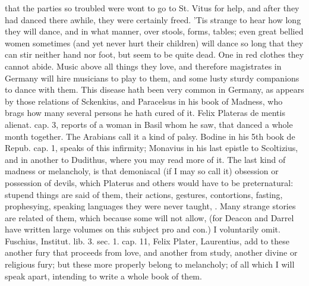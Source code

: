 {that the parties so troubled were wont to go to St. Vitus for help, and
after they had danced there awhile, they were certainly freed.
'Tis strange to hear how long they will dance, and in what manner, over
stools, forms, tables; even great bellied women sometimes (and yet
never hurt their children) will dance so long that they can stir
neither hand nor foot, but seem to be quite dead. One in red clothes
they cannot abide. Music above all things they love, and therefore
magistrates in Germany will hire musicians to play to them, and some
lusty sturdy companions to dance with them. This disease hath been very
common in Germany, as appears by those relations of Sckenkius, and
Paracelsus in his book of Madness, who brags how many several persons
he hath cured of it. Felix Plateras de mentis alienat. cap. 3, reports
of a woman in Basil whom he saw, that danced a whole month together.
The Arabians call it a kind of palsy. Bodine in his 5th book de Repub.
cap. 1, speaks of this infirmity; Monavius in his last epistle to
Scoltizius, and in another to Dudithus, where you may read more of it.
The last kind of madness or melancholy, is that demoniacal (if I may so
call it) obsession or possession of devils, which Platerus and others
would have to be preternatural: stupend things are said of them, their
actions, gestures, contortions, fasting, prophesying, speaking
languages they were never taught, \etc{}. Many strange stories are related
of them, which because some will not allow, (for Deacon and Darrel have
written large volumes on this subject pro and con.) I voluntarily omit.
Fuschius, Institut. lib. 3. sec. 1. cap. 11, Felix Plater,
Laurentius, add to these another fury that proceeds from love, and
another from study, another divine or religious fury; but these more
properly belong to melancholy; of all which I will speak apart,
intending to write a whole book of them.

}
